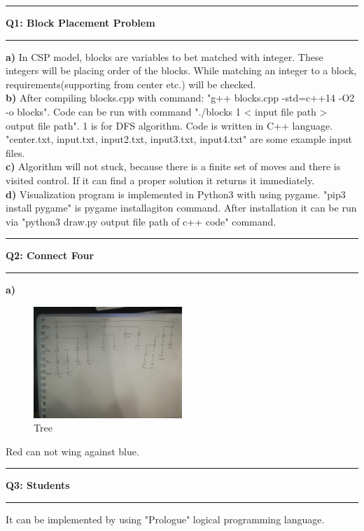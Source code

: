 \documentclass[11pt]{article}
\newcommand\question[2]{\vspace{.25in}\hrule\textbf{#1: #2}\vspace{.5em}\hrule\vspace{.10in}}
\renewcommand\part[1]{\vspace{.10in}\textbf{#1}}
\begin{document}
\raggedright
	\newcommand\NAME{Muhammed Burak Bugrul}
	\newcommand\ANDREWID{150140015}
	\newcommand\HWNUM{2}
	\question{Q1}{Block Placement Problem}
	\part{a)} In CSP model, blocks are variables to bet matched with integer. These integers will be placing order of the blocks. While matching an integer to a block, requirements(supporting from center etc.) will be checked.\\
	\part{b)} After compiling blocks.cpp with command: "g++ blocks.cpp -std=c++14 -O2 -o blocks". Code can be run with command "./blocks 1 < {input file path} > {output file path}". 1 is for DFS algorithm. Code is written in C++ language. "center.txt, input.txt, input2.txt, input3.txt, input4.txt" are some example input files.\\
	\part{c)} Algorithm will not stuck, because there is a finite set of moves and there is visited control. If it can find a proper solution it returns it immediately.\\
	\part{d)} Visualization program is implemented in Python3 with using pygame. "pip3 install pygame" is pygame installagiton command. After installation it can be run via "python3 draw.py {output file path of c++ code}" command.
	
	\question{Q2}{Connect Four}
	\part{a)}
	\begin{figure}[h!]
		\centering
		\includegraphics[width=0.5\textwidth]{tree.jpeg}
		\caption{Tree}
		\label{fig:Tree}
	\end{figure}
		Red can not wing against blue.
	\question{Q3}{Students}
	It can be implemented by using "Prologue" logical programming language.
\end{document}
